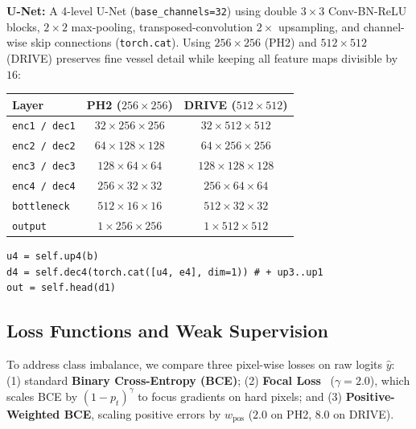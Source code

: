 \textbf{U-Net:} A 4-level U-Net (\texttt{base\_channels=32}) using double $3\times3$ Conv-BN-ReLU blocks, $2\times2$ max-pooling, transposed-convolution $2\times$ upsampling, and channel-wise skip connections (\texttt{torch.cat}). Using $256\times256$ (PH2) and $512\times512$ (DRIVE) preserves fine vessel detail while keeping all feature maps divisible by $16$:
\begin{center}
\small
\begin{tabular}{@{}lcc@{}}
\toprule
Layer & PH2 ($256\times256$) & DRIVE ($512\times512$) \\
\midrule
\texttt{enc1 / dec1} & $32\times256\times256$ & $32\times512\times512$ \\
\texttt{enc2 / dec2} & $64\times128\times128$ & $64\times256\times256$ \\
\texttt{enc3 / dec3} & $128\times64\times64$  & $128\times128\times128$ \\
\texttt{enc4 / dec4} & $256\times32\times32$  & $256\times64\times64$ \\
\texttt{bottleneck}  & $512\times16\times16$  & $512\times32\times32$ \\
\texttt{output}      & $1\times256\times256$  & $1\times512\times512$ \\
\bottomrule
\end{tabular}
\end{center}
\begin{lstlisting}[caption={U-Net decoder skip concatenation (\texttt{UNetModel.py}).}]
u4 = self.up4(b)
d4 = self.dec4(torch.cat([u4, e4], dim=1)) # + up3..up1
out = self.head(d1)
\end{lstlisting}

\subsection{Loss Functions and Weak Supervision}
To address class imbalance, we compare three pixel-wise losses on raw logits $\hat{y}$: (1) standard \textbf{Binary Cross-Entropy (BCE)}; (2) \textbf{Focal Loss}~\cite{lin2017focal} ($\gamma=2.0$), which scales BCE by $(1-p_t)^\gamma$ to focus gradients on hard pixels; and (3) \textbf{Positive-Weighted BCE}, scaling positive errors by $w_{\text{pos}}$ ($2.0$ on PH2, $8.0$ on DRIVE).

